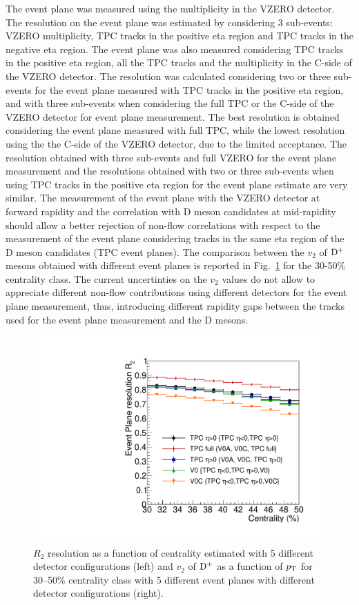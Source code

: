 The event plane was measured using the multiplicity in the VZERO
detector. The resolution on the event plane was estimated by considering 3
sub-events: VZERO multiplicity, TPC tracks in the positive eta region
and TPC tracks in the negative eta region. The event plane was also
measured considering TPC tracks in the positive eta region, all the
TPC tracks and the multiplicity in the C-side of the VZERO
detector. The resolution was calculated considering two or three
sub-events for the event plane measured with TPC tracks in the
positive eta region, and with three sub-events when considering the
full TPC or the C-side of the VZERO detector for event plane
measurement. The best resolution is obtained considering the event
plane measured with full TPC, while the lowest resolution using the
the C-side of the VZERO detector, due to the limited acceptance. The
resolution obtained with three sub-events and full VZERO for the event
plane measurement and the resolutions obtained with two or three
sub-events when using TPC tracks in the positive eta region for the
event plane estimate are very similar. The
measurement of the event plane with the VZERO detector at forward
rapidity and the correlation with D meson candidates at mid-rapidity
should allow a better rejection of non-flow correlations with respect
to the measurement of the event plane considering tracks in the same
eta region of the D meson candidates (TPC event planes).
The comparison between the $v_2$ of ${\rm D^+}$ mesons obtained with 
different event planes is reported in 
Fig.~\ref{fig:dplus-4ep} for the 30-50\% centrality class. 
The current uncertinties on the $v_2$ values do not allow to
appreciate different non-flow contributions using different detectors
for the event plane measurement, thus, introducing different
rapidity gaps between the tracks used for the event plane measurement
and the D mesons.

\begin{figure}
\centering
  \includegraphics[width=.45\textwidth]{FigCap5/EPresolution_comparison.pdf}
\caption{$R_2$ resolution as a function of centrality estimated with 5 different detector configurations (left) and $v_2$ of ${\rm D^+}$ as a function of $p_{\rm T}$ for 30--50\% centrality class with 5 different event planes with different detector configurations (right).}
\label{fig:dplus-4ep}
\end{figure}


